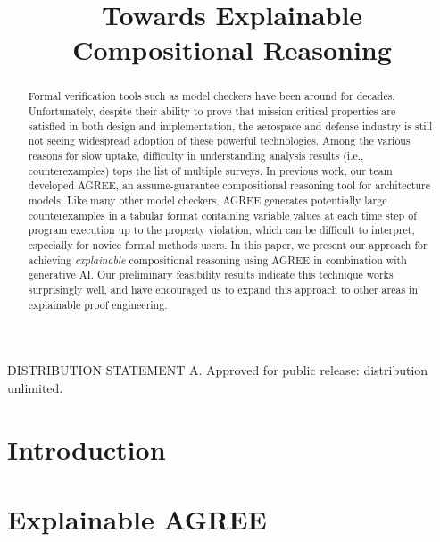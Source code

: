 \documentclass[conference]{IEEEtran}
\begin{document}
\title{Towards Explainable Compositional Reasoning}

\author{
	}



\maketitle

\begin{abstract}

Formal verification tools such as model checkers have been around for decades.  Unfortunately, despite their ability to prove that mission-critical properties are satisfied in both design and implementation, the aerospace and defense industry is still not seeing widespread adoption of these powerful technologies. 
%
Among the various reasons for slow uptake, difficulty in understanding analysis results (i.e., counterexamples) tops the list of multiple surveys.
%
In previous work, our team developed AGREE, an assume-guarantee compositional reasoning tool for architecture models.  Like many other model checkers, AGREE generates potentially large counterexamples in a tabular format containing variable values at each time step of program execution up to the property violation, which can be difficult to interpret, especially for novice formal methods users.
In this paper, we present our approach for achieving \textit{explainable} compositional reasoning using AGREE in combination with generative AI.  Our preliminary feasibility results indicate this technique works surprisingly well, and have encouraged us to expand this approach to other areas in explainable proof engineering.  
	

\end{abstract}

\vspace{12pt}
DISTRIBUTION STATEMENT A. Approved for public release: distribution unlimited.

\section{Introduction}
\label{sec:introduction}


\section{Explainable AGREE}
\label{sec:agree}

\end{document}
